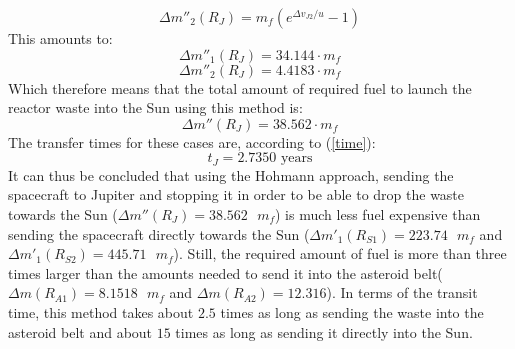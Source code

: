 \documentclass[onecolumn,12pt]{article}
\numberwithin{equation}{section}
\begin{document}
\begin{equation}
    \Delta m''_2 (R_J) = m_f (e^{\Delta v_{J2}/u}-1)
\end{equation}
This amounts to:
\begin{equation}
    \Delta m''_1(R_J) = 34.144 \cdot m_f
\end{equation}
\begin{equation}
    \Delta m''_2 (R_J) = 4.4183 \cdot m_f 
\end{equation}
Which therefore means that the total amount of required fuel to launch the reactor waste into the Sun using this method is:
\begin{equation}
    \Delta m'' (R_J) = 38.562 \cdot m_f
    \label{DODONBATON}
\end{equation}
The transfer times for these cases are, according to (\ref{time}):
\begin{equation}
    t_{J} = 2.7350 \text{ years}
\end{equation}
It can thus be concluded that using the Hohmann approach, sending the spacecraft to Jupiter and stopping it in order to be able to drop the waste towards the Sun ($\Delta m'' (R_J) = 38.562 \text{ } m_f$) is much less fuel expensive than sending the spacecraft directly towards the Sun ($\Delta m'_1 (R_{S1}) = 223.74 \text{ }m_f$ and $\Delta m'_1 (R_{S2}) = 445.71 \text{ } m_f$). Still, the required amount of fuel is more than three times larger than the amounts needed to send it into the asteroid belt($\Delta m (R_{A1}) = 8.1518 \text{ } m_f$ and $\Delta m (R_{A2}) = 12.316$). In terms of the transit time, this method takes about $2.5$ times as long as sending the waste into the asteroid belt and about $15$ times as long as sending it directly into the Sun.
\end{document}
